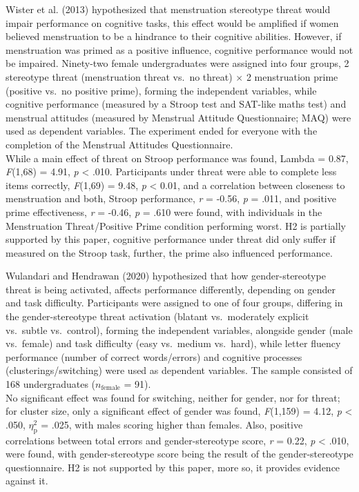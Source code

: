 \documentclass[
  stu, a4paper,floatsintext]{apa7}
\begin{document}
Wister et al. (2013) hypothesized that menstruation stereotype threat would impair performance on cognitive tasks, this effect would be amplified if women believed menstruation to be a hindrance to their cognitive abilities.
However, if menstruation was primed as a positive influence, cognitive performance would not be impaired.
Ninety-two female undergraduates were assigned into four groups, 2 stereotype threat (menstruation threat vs.~no threat) \(\times\) 2 menstruation prime (positive vs.~no positive prime), forming the independent variables, while cognitive performance (measured by a Stroop test and SAT-like maths test) and menstrual attitudes (measured by Menstrual Attitude Questionnaire; MAQ) were used as dependent variables.
The experiment ended for everyone with the completion of the Menstrual Attitudes Questionnaire.\\
While a main effect of threat on Stroop performance was found, Lambda = 0.87, \emph{F}(1,68) = 4.91, \emph{p} \textless{} .010.
Participants under threat were able to complete less items correctly, \emph{F}(1,69) = 9.48, \emph{p} \textless{} 0.01, and a correlation between closeness to menstruation and both, Stroop performance, \emph{r} = -0.56, \emph{p} = .011, and positive prime effectiveness, \emph{r} = -0.46, \emph{p} = .610 were found, with individuals in the Menstruation Threat/Positive Prime condition performing worst.
H2 is partially supported by this paper, cognitive performance under threat did only suffer if measured on the Stroop task, further, the prime also influenced performance.

Wulandari and Hendrawan (2020) hypothesized that how gender-stereotype threat is being activated, affects performance differently, depending on gender and task difficulty.
Participants were assigned to one of four groups, differing in the gender-stereotype threat activation (blatant vs.~moderately explicit vs.~subtle vs.~control), forming the independent variables, alongside gender (male vs.~female) and task difficulty (easy vs.~medium vs.~hard), while letter fluency performance (number of correct words/errors) and cognitive processes (clusterings/switching) were used as dependent variables.
The sample consisted of 168 undergraduates (\(n_{\text{female}}\) = 91).\\
No significant effect was found for switching, neither for gender, nor for threat; for cluster size, only a significant effect of gender was found, \emph{F}(1,159) = 4.12, \emph{p} \textless{} .050, \(\eta^{2}_{\text{p}}\) = .025, with males scoring higher than females.
Also, positive correlations between total errors and gender-stereotype score, \emph{r} = 0.22, \emph{p} \textless{} .010, were found, with gender-stereotype score being the result of the gender-stereotype questionnaire.
H2 is not supported by this paper, more so, it provides evidence against it.
\end{document}
